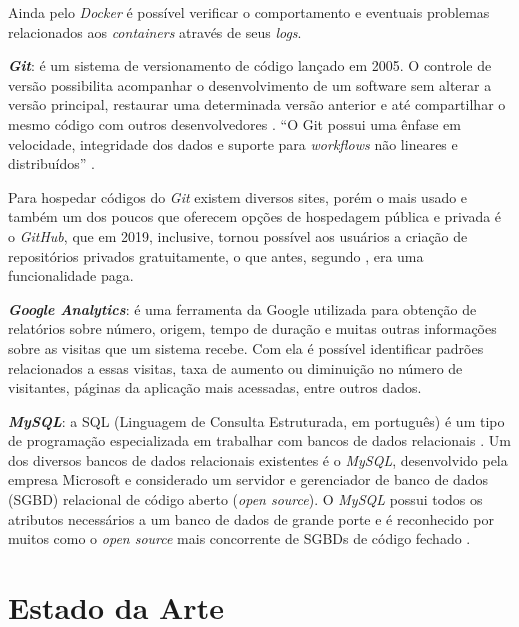 Ainda pelo \textit{Docker} é possível verificar o comportamento e eventuais problemas relacionados aos \textit{containers} através de seus \textit{logs}.

\textbf{\textit{Git}}: é um sistema de versionamento de código lançado em 2005. O controle de versão possibilita acompanhar o desenvolvimento de um
software sem alterar a versão principal, restaurar uma determinada versão anterior e até compartilhar o mesmo código com outros desenvolvedores 
. ``O Git possui uma ênfase em velocidade, integridade dos dados e suporte para \textit{workflows} não lineares e distribuídos''
\cite[p. 10]{ghezzi2015api}.

Para hospedar códigos do \textit{Git} existem diversos sites, porém o mais usado e também um dos poucos que oferecem opções de hospedagem pública e privada é o \textit{GitHub}, que em 2019, inclusive, tornou possível aos usuários a criação de repositórios privados gratuitamente, o que antes, segundo , era uma funcionalidade paga. 

\textbf{\textit{Google Analytics}}: é uma ferramenta da Google utilizada para obtenção de relatórios sobre número, origem, tempo de duração e muitas outras informações sobre as visitas que um sistema recebe. Com ela é possível identificar padrões relacionados a essas visitas, taxa de aumento ou diminuição no número de visitantes, páginas da aplicação mais acessadas, entre outros dados. 

\textbf{\textit{MySQL}}: a SQL (Linguagem de Consulta Estruturada, em português) é um tipo de programação especializada em trabalhar com bancos de dados relacionais \cite[~p. 7, tradução nossa]{mysql2001mysql}. Um dos diversos bancos de dados relacionais existentes é o \textit{MySQL}, desenvolvido pela empresa Microsoft e considerado um servidor e gerenciador de banco de dados (SGBD) relacional de código aberto (\textit{open source}). O \textit{MySQL} possui todos os atributos necessários a um banco de dados de grande porte e é reconhecido por muitos como o \textit{open source} mais concorrente de SGBDs de código fechado .


\hspace{2.5cm}

\hspace{2.5cm}
\section{Estado da Arte}
\label{sec:trabalhoscorrelatos}
\hspace{2.5cm}


